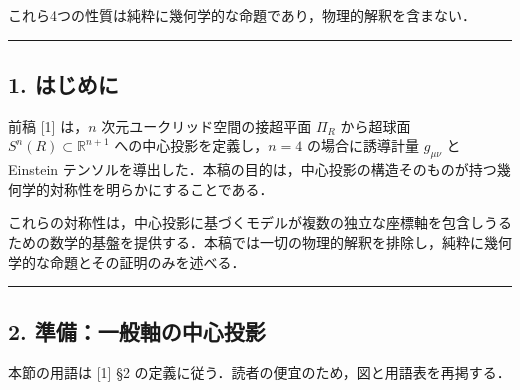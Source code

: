 \documentclass[a4paper,11pt]{ltjsarticle}
\theoremstyle{definition}
\begin{document}
これら4つの性質は純粋に幾何学的な命題であり，物理的解釈を含まない．

\begin{center}\rule{0.5\linewidth}{0.5pt}\end{center}

\subsection{1. はじめに}\label{ux306fux3058ux3081ux306b}

前稿 {[}1{]} は，\(n\) 次元ユークリッド空間の接超平面 \(\Pi_R\) から超球面 \(S^n(R) \subset \mathbb{R}^{n+1}\) への中心投影を定義し，\(n = 4\) の場合に誘導計量 \(g_{\mu\nu}\) と Einstein テンソルを導出した．本稿の目的は，中心投影の構造そのものが持つ幾何学的対称性を明らかにすることである．

これらの対称性は，中心投影に基づくモデルが複数の独立な座標軸を包含しうるための数学的基盤を提供する．本稿では一切の物理的解釈を排除し，純粋に幾何学的な命題とその証明のみを述べる．

\begin{center}\rule{0.5\linewidth}{0.5pt}\end{center}

\subsection{2. 準備：一般軸の中心投影}\label{ux6e96ux5099ux4e00ux822cux8ef8ux306eux4e2dux5fc3ux6295ux5f71}

本節の用語は {[}1{]} §2 の定義に従う．読者の便宜のため，図と用語表を再掲する．
\end{document}
